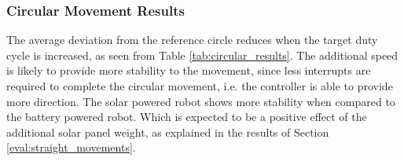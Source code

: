 \begin{table}[t]
	\centering
	\caption{The Euclidean distance between the measurements and a best fitting circle.}
	\label{tab:circular_results}
\end{table}

\subsubsection{Circular Movement Results}
The average deviation from the reference circle reduces when the target duty cycle is increased, as seen from Table \ref{tab:circular_results}.
The additional speed is likely to provide more stability to the movement, since less interrupts are required to complete the circular movement, i.e. the controller is able to provide more direction.
The solar powered robot shows more stability when compared to the battery powered robot.
Which is expected to be a positive effect of the additional solar panel weight, as explained in the results of Section \ref{eval:straight_movements}.
